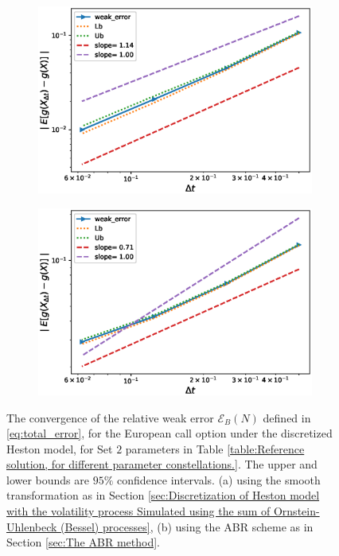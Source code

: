 \FloatBarrier
\begin{figure}[htb]
	\centering %
	\begin{subfigure}{0.4\textwidth}
		\includegraphics[width=\linewidth]{./figures/Heston_single_call_smooth_vol/weak_convergence/weak_convergence_order_single_call_option_heston_relative_M_2_10_6_beta_512_smooth_scheme_set2}
		\caption{}
		\label{fig:1}
	\end{subfigure}\hfil %
	\begin{subfigure}{0.4\textwidth}
		\includegraphics[width=\linewidth]{./figures/Heston_single_call_ABR_moment_matching/weak_convergence/weak_convergence_order_single_call_option_heston_relative_M_1_10_7_beta_128_ABR_set2}
		\caption{}
		\label{fig:2}
	\end{subfigure}\hfil %
	\caption{The convergence of the relative weak error  $\mathcal{E}_B(N)$ defined in \ref{eq:total_error}, for the European call option  under the discretized  Heston model, for Set $2$ parameters in Table \ref{table:Reference solution, for different parameter constellations.}. The upper and lower bounds are $95\%$ confidence intervals. (a) using the smooth transformation as in Section \ref{sec:Discretization of Heston model with the volatility process Simulated using the sum of  Ornstein-Uhlenbeck (Bessel) processes}, (b) using the ABR scheme as in Section \ref{sec:The ABR method}.}
	\label{fig:weak convergence comparison set 2}	
\end{figure}
\FloatBarrier

